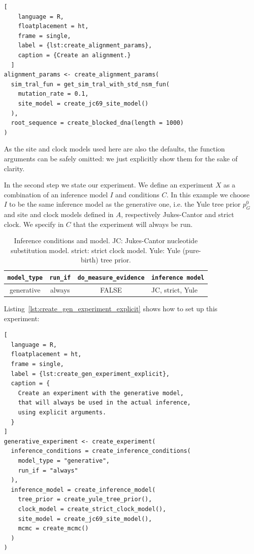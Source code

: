 \begin{lstlisting}[
    language = R,
    floatplacement = ht,
    frame = single,
    label = {lst:create_alignment_params}, 
    caption = {Create an alignment.}
  ]
alignment_params <- create_alignment_params(
  sim_tral_fun = get_sim_tral_with_std_nsm_fun(
    mutation_rate = 0.1,
    site_model = create_jc69_site_model()
  ),
  root_sequence = create_blocked_dna(length = 1000)
)
\end{lstlisting}

As the site and clock models used here are also the defaults, 
the function arguments can be safely omitted: we just explicitly show 
them for the sake of clarity.

In the second step we state our experiment.
We define an experiment $\mathit{X}$ as a combination of an inference model 
$\mathit{I}$ and conditions $\mathit{C}$.
In this example we choose $\mathit{I}$ to be the same inference model as 
the generative one,
i.e. the Yule tree prior $\mathit{p_{G}^0}$ and site 
and clock models defined in $\mathit{A}$, 
respectively Jukes-Cantor and strict clock.
We specify in $\mathit{C}$ that the experiment will always be run.

\begin{table}
  \begin{tabular}{ | c | c | c | l | }
    \hline
    \texttt{model\_type} &
    \texttt{run\_if} &
    \texttt{do\_measure\_evidence} & 
    \texttt{inference model} \\ 
    \hline
    generative &
    always &
    FALSE &
    JC, strict, Yule \\
    \hline
  \end{tabular}
  \caption{
    Inference conditions and model.
    JC: Jukes-Cantor nucleotide substitution model.
    strict: strict clock model.
    Yule: Yule (pure-birth) tree prior.
  }
  \label{tab:RQ1}
\end{table}

Listing~\ref{lst:create_gen_experiment_explicit} shows how to
set up this experiment:

\begin{lstlisting}[
  language = R,
  floatplacement = ht,
  frame = single,
  label = {lst:create_gen_experiment_explicit},
  caption = {
    Create an experiment with the generative model,
    that will always be used in the actual inference, 
    using explicit arguments.
  }
]
generative_experiment <- create_experiment(
  inference_conditions = create_inference_conditions(
    model_type = "generative", 
    run_if = "always"
  ), 
  inference_model = create_inference_model(
    tree_prior = create_yule_tree_prior(),
    clock_model = create_strict_clock_model(), 
    site_model = create_jc69_site_model(),
    mcmc = create_mcmc()
  )
)
\end{lstlisting}

